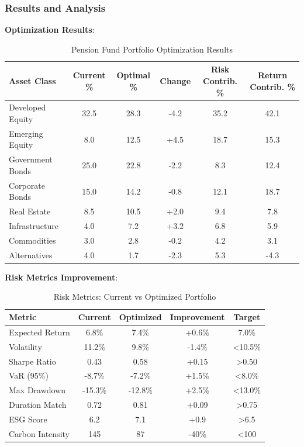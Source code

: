 \documentclass[12pt,a4paper]{article}
\theoremstyle{definition}
\theoremstyle{remark}
\begin{document}
\subsubsection{Results and Analysis}

\textbf{Optimization Results}:

\begin{table}[H]
\centering
\caption{Pension Fund Portfolio Optimization Results}
\begin{tabular}{@{}lccccc@{}}
\toprule
Asset Class & Current \% & Optimal \% & Change & Risk Contrib. \% & Return Contrib. \% \\
\midrule
Developed Equity & 32.5 & 28.3 & -4.2 & 35.2 & 42.1 \\
Emerging Equity & 8.0 & 12.5 & +4.5 & 18.7 & 15.3 \\
Government Bonds & 25.0 & 22.8 & -2.2 & 8.3 & 12.4 \\
Corporate Bonds & 15.0 & 14.2 & -0.8 & 12.1 & 18.7 \\
Real Estate & 8.5 & 10.5 & +2.0 & 9.4 & 7.8 \\
Infrastructure & 4.0 & 7.2 & +3.2 & 6.8 & 5.9 \\
Commodities & 3.0 & 2.8 & -0.2 & 4.2 & 3.1 \\
Alternatives & 4.0 & 1.7 & -2.3 & 5.3 & -4.3 \\
\bottomrule
\end{tabular}
\end{table}

\textbf{Risk Metrics Improvement}:

\begin{table}[H]
\centering
\caption{Risk Metrics: Current vs Optimized Portfolio}
\begin{tabular}{@{}lcccc@{}}
\toprule
Metric & Current & Optimized & Improvement & Target \\
\midrule
Expected Return & 6.8\% & 7.4\% & +0.6\% & 7.0\% \\
Volatility & 11.2\% & 9.8\% & -1.4\% & <10.5\% \\
Sharpe Ratio & 0.43 & 0.58 & +0.15 & >0.50 \\
VaR (95\%) & -8.7\% & -7.2\% & +1.5\% & <8.0\% \\
Max Drawdown & -15.3\% & -12.8\% & +2.5\% & <13.0\% \\
Duration Match & 0.72 & 0.81 & +0.09 & >0.75 \\
ESG Score & 6.2 & 7.1 & +0.9 & >6.5 \\
Carbon Intensity & 145 & 87 & -40\% & <100 \\
\bottomrule
\end{tabular}
\end{table}
\end{document}
